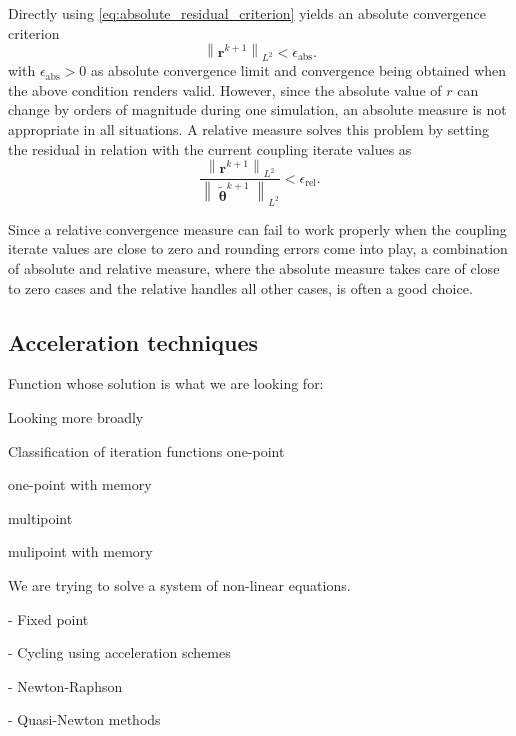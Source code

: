 Directly using \eqref{eq:absolute_residual_criterion} yields an absolute convergence criterion
\begin{equation}
\left\|\boldsymbol{r} ^{k+1}\right\|_{L^{2}}<\epsilon_\mathrm{abs}.
\end{equation}
with $\epsilon_\mathrm{abs}>0$ as absolute convergence limit and convergence being obtained when the above condition renders valid.
However, since the absolute value of $r$ can change by orders of magnitude during one simulation, an absolute measure is not appropriate in all situations.
A relative measure solves this problem by setting the residual in relation with the current coupling iterate values as
\begin{equation}
\frac{\left\|\mathbf{r}^{k+1}\right\|_{L^{2}}}{\left\|\tilde{\bm{\uptheta}}^{k+1}\right\|_{L^{2}}}<\epsilon_\mathrm{rel}.
\end{equation}

Since a relative convergence measure can fail to work properly when the coupling iterate values are close to zero and rounding errors come into play, a combination of absolute and relative measure, where the absolute measure takes care of close to zero cases and the relative handles all other cases, is often a good choice.

\subsection{Acceleration techniques}

Function whose solution is what we are looking for:



Looking more broadly

Classification of iteration functions
one-point

one-point with memory

multipoint

mulipoint with memory


We are trying to solve a system of non-linear equations.

- Fixed point

- Cycling using acceleration schemes


- Newton-Raphson

- Quasi-Newton methods


